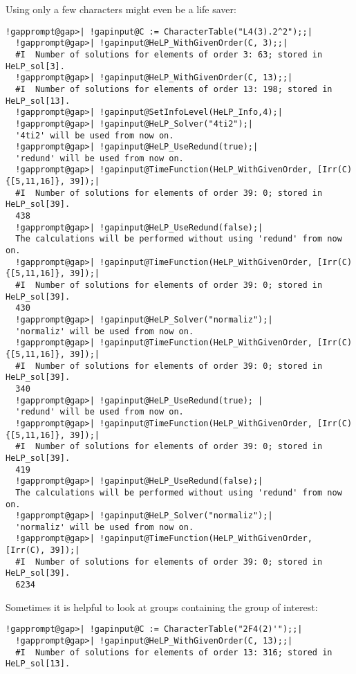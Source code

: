 \documentclass[a4paper,11pt]{report}
\begin{document}
{{ Using only a few characters might even be a life saver: 
\begin{Verbatim}[commandchars=!@|,fontsize=\small,frame=single,label=Example]
  !gapprompt@gap>| !gapinput@C := CharacterTable("L4(3).2^2");;|
  !gapprompt@gap>| !gapinput@HeLP_WithGivenOrder(C, 3);;|
  #I  Number of solutions for elements of order 3: 63; stored in HeLP_sol[3].
  !gapprompt@gap>| !gapinput@HeLP_WithGivenOrder(C, 13);;|
  #I  Number of solutions for elements of order 13: 198; stored in HeLP_sol[13].
  !gapprompt@gap>| !gapinput@SetInfoLevel(HeLP_Info,4);|
  !gapprompt@gap>| !gapinput@HeLP_Solver("4ti2");|
  '4ti2' will be used from now on.
  !gapprompt@gap>| !gapinput@HeLP_UseRedund(true);|
  'redund' will be used from now on.
  !gapprompt@gap>| !gapinput@TimeFunction(HeLP_WithGivenOrder, [Irr(C){[5,11,16]}, 39]);|
  #I  Number of solutions for elements of order 39: 0; stored in HeLP_sol[39].  
  438
  !gapprompt@gap>| !gapinput@HeLP_UseRedund(false);|
  The calculations will be performed without using 'redund' from now on.
  !gapprompt@gap>| !gapinput@TimeFunction(HeLP_WithGivenOrder, [Irr(C){[5,11,16]}, 39]);|
  #I  Number of solutions for elements of order 39: 0; stored in HeLP_sol[39].  
  430
  !gapprompt@gap>| !gapinput@HeLP_Solver("normaliz");|
  'normaliz' will be used from now on.
  !gapprompt@gap>| !gapinput@TimeFunction(HeLP_WithGivenOrder, [Irr(C){[5,11,16]}, 39]);|
  #I  Number of solutions for elements of order 39: 0; stored in HeLP_sol[39].  
  340
  !gapprompt@gap>| !gapinput@HeLP_UseRedund(true); |
  'redund' will be used from now on.
  !gapprompt@gap>| !gapinput@TimeFunction(HeLP_WithGivenOrder, [Irr(C){[5,11,16]}, 39]);|
  #I  Number of solutions for elements of order 39: 0; stored in HeLP_sol[39].  
  419
  !gapprompt@gap>| !gapinput@HeLP_UseRedund(false);|
  The calculations will be performed without using 'redund' from now on.
  !gapprompt@gap>| !gapinput@HeLP_Solver("normaliz");|
  'normaliz' will be used from now on.
  !gapprompt@gap>| !gapinput@TimeFunction(HeLP_WithGivenOrder, [Irr(C), 39]);|
  #I  Number of solutions for elements of order 39: 0; stored in HeLP_sol[39].  
  6234
\end{Verbatim}
 Sometimes it is helpful to look at groups containing the group of interest: 
\begin{Verbatim}[commandchars=!@|,fontsize=\small,frame=single,label=Example]
  !gapprompt@gap>| !gapinput@C := CharacterTable("2F4(2)'");;|
  !gapprompt@gap>| !gapinput@HeLP_WithGivenOrder(C, 13);;|
  #I  Number of solutions for elements of order 13: 316; stored in HeLP_sol[13].

\end{Verbatim}}}
\end{document}
